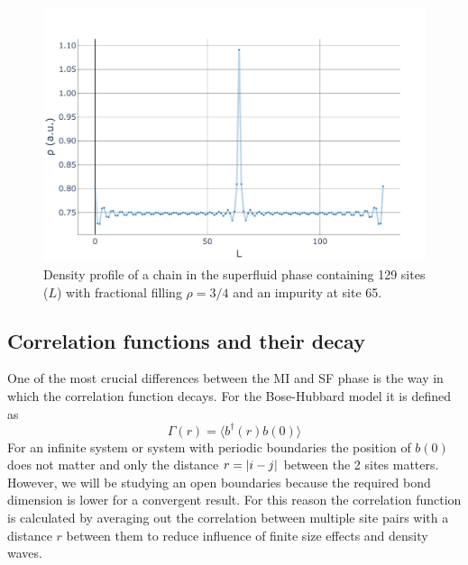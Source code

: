 \documentclass[twoside,twocolumn,9pt]{article}
\begin{document}
\begin{center}
  \begin{figure}
      \includegraphics[width=\linewidth]{../code/figures/Density-profiles-fractional-impurity.pdf}
      \caption{Density profile of a chain in the superfluid phase containing 129 sites ($L$) with fractional filling $\rho=3/4$ and an impurity at site 65.}
      \label{fig:waves-impurity}
  \end{figure}
\end{center}

\subsection{Correlation functions and their decay}
One of the most crucial differences between the MI and SF phase is the way in which the correlation function decays. For the Bose-Hubbard model it is defined as
\begin{equation}
    \Gamma(r) = \langle b^\dagger(r)b(0)\rangle
\end{equation}
For an infinite system or system with periodic boundaries the position of $b(0)$ does not matter and only the distance $r=\abs{i-j}$ between the 2 sites matters. However, we will be studying an open boundaries because the required bond dimension is lower for a convergent result. For this reason the correlation function is calculated by averaging out the correlation between multiple site pairs with a distance $r$ between them to reduce influence of finite size effects and density waves. 
\end{document}
